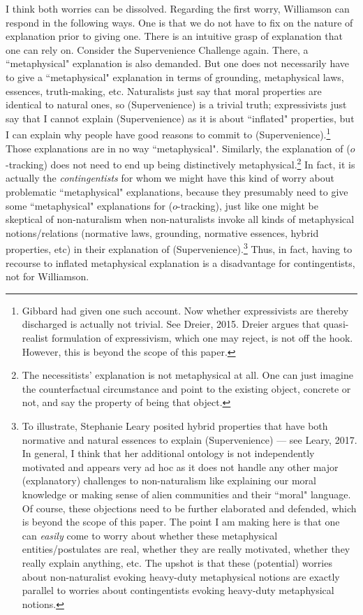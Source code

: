 I think both worries can be dissolved. 
Regarding the first worry, Williamson can respond in the following ways. 
One is that we do not have to fix on the nature of explanation prior to giving one. There is an intuitive grasp of explanation that one can rely on. Consider the Supervenience Challenge again. There, a ``metaphysical" explanation is also demanded. But one does not necessarily have to give a ``metaphysical" explanation in terms of grounding, metaphysical laws, essences, truth-making, etc. Naturalists just say that moral properties are identical to natural ones, so (Supervenience) is a trivial truth; expressivists just say that I cannot explain (Supervenience) as it is about ``inflated" properties, but I can explain why people have good reasons to commit to (Supervenience).\footnote{Gibbard had given one such account. Now whether expressivists are thereby discharged is actually not trivial. See Dreier, 2015. Dreier argues that quasi-realist formulation of expressivism, which one may reject, is not off the hook. However, this is beyond the scope of this paper.} Those explanations are in no way ``metaphysical". Similarly, the explanation of ($o$-tracking) does not need to end up being distinctively metaphysical.\footnote{The necessitists' explanation is not metaphysical at all. One can just imagine the counterfactual circumstance and point to the existing object, concrete or not, and say the property of being that object.} 
In fact, it is actually the \emph{contingentists} for whom we might have this kind of worry about problematic ``metaphysical" explanations, because they presumably need to give some ``metaphysical" explanations for ($o$-tracking), just like one might be skeptical of non-naturalism when non-naturalists invoke all kinds of metaphysical notions/relations (normative laws, grounding, normative essences, hybrid properties, etc) in their explanation of (Supervenience).\footnote{To illustrate, Stephanie Leary posited hybrid properties that have both normative and natural essences to explain (Supervenience) --- see Leary, 2017. In general, I think that her additional ontology is not independently motivated and appears very ad hoc as it does not handle any other major (explanatory) challenges to non-naturalism like explaining our moral knowledge or making sense of alien communities and their ``moral" language. Of course, these objections need to be further elaborated and defended, which is beyond the scope of this paper. The point I am making here is that one can \emph{easily} come to worry about whether these metaphysical entities/postulates are real, whether they are really motivated, whether they really explain anything, etc. The upshot is that these (potential) worries about non-naturalist evoking heavy-duty metaphysical notions are exactly parallel to worries about contingentists evoking heavy-duty metaphysical notions.} Thus, in fact, having to recourse to inflated metaphysical explanation is a disadvantage for contingentists, not for Williamson. 

